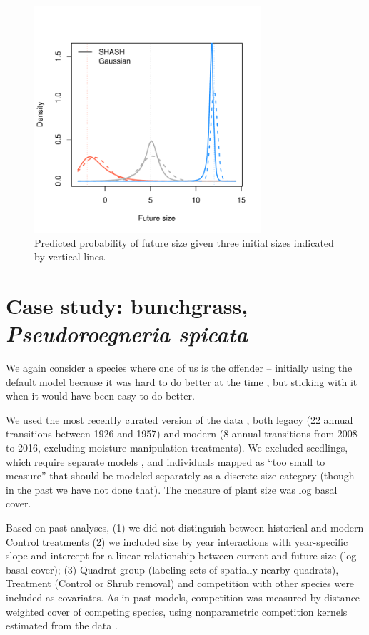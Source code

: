 \documentclass[12pt]{article}
\begin{document}
 \begin{figure}
\centering
\includegraphics[width=0.75\textwidth]{figures/cactus_growth_compare}
\caption{Predicted probability of future size given three initial sizes indicated by vertical lines.}
\label{fig:cactus_growth_compare}
\end{figure} 

\clearpage   

\section{Case study: bunchgrass, \emph{Pseudoroegneria spicata}}

We again consider a species where one of us is the offender -- initially using the default model because 
it was hard to do better at the time \citep{adler-etal-2010}, but sticking with it 
\citep[e.g.,][]{Tredennick2018, Adler-2018} when it would have been easy to do better. 

We used the most recently curated version of the data \citep[][at doi.org/10.5061/dryad.96dn293]{Adler-2018},
both legacy (22 annual transitions between 1926 and 1957) and modern (8 annual transitions from
2008 to 2016, excluding moisture manipulation treatments). We excluded seedlings, which require separate models
\citep{Chu-2014a, Chu-2015, snyder-ellner-2018}, and individuals mapped as ``too small to measure'' that should be modeled separately
as a discrete size category (though in the past we have not done that). The measure of plant size was log basal cover. 

Based on past analyses, (1) we did not distinguish between historical and 
modern Control treatments \citep{Adler-2018} (2) we included size by year interactions with year-specific slope and intercept
for a linear relationship between current and future size (log basal cover); (3) Quadrat group (labeling sets of spatially
nearby quadrats), Treatment (Control or Shrub removal) and competition with other species were included as covariates. 
As in past models, competition was measured by distance-weighted cover of competing species, using nonparametric competition
kernels estimated from the data \citep{Teller-2016}. 
\end{document}
